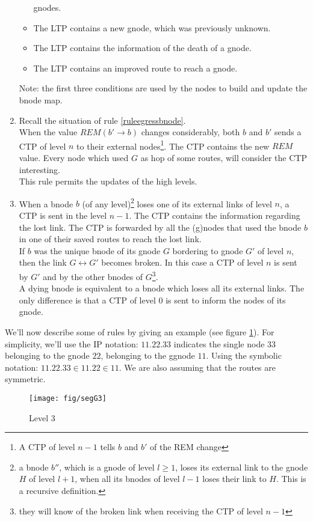 \documentclass[a4paper]{article}
\begin{document}
\begin{enumerate}
\begin{itemize}
				gnodes.
			\item The LTP contains a new gnode, which was
				previously unknown.
			\item The LTP contains the information of the death of a
				gnode.
			\item The LTP contains an improved route to reach a
				gnode.
		\end{itemize}
		Note: the first three conditions are used by the nodes to
		build and update the bnode map.
	\item Recall the situation of rule \ref{ruleegressbnode}.\\
		When the value $REM(b'\rightarrow b)$ changes
		considerably,
		both $b$ and $b'$ sends a CTP of level $n$ to their external
		nodes\footnote{A CTP of level $n-1$ tells $b$ and $b'$ of the
		REM change}. The CTP contains the new $REM$ value. Every node which used $G$ as hop of some routes,
		will consider the CTP interesting.\\
		This rule permits the updates of the high levels.
	\item When a bnode $b$ (of any level)\footnote{a bnode $b''$, which is a
		gnode of level $l\ge 1$, loses its external link to the gnode
		$H$ of level $l+1$, when all its
		bnodes of level $l-1$ loses their link to $H$. This is a
		recursive definition.}
		loses one of its external links of
		level $n$, a CTP is sent in the level $n-1$.  The CTP contains
		the information regarding the lost link.
		The CTP is forwarded by all the (g)nodes that used the
		bnode $b$ in one of their saved routes to reach the lost link.\\
		If $b$ was the unique bnode of its gnode $G$
		bordering to gnode $G'$ of level $n$, then the link
		$G\leftrightarrow G'$ becomes broken. In this case a CTP of
		level $n$ is sent by $G'$ and by the other bnodes of
		$G$\footnote{they will know of the broken link when receiving
		the CTP of level $n-1$}.\\
		A dying bnode is equivalent to a bnode which loses all its
		external links. The only difference is that a CTP of level 0
		is sent to inform the nodes of its gnode.
\end{enumerate}
We'll now describe some of rules by giving an example (see figure
\ref{figexq2}). For simplicity, we'll use the IP notation: $11.22.33$
indicates the single node $33$ belonging to the gnode $22$, belonging to the
ggnode $11$. Using the symbolic notation: $11.22.33 \in 11.22 \in 11$. We are
also assuming that the routes are symmetric.
\begin{figure}[h]
	\begin{center}
		\texttt{[image: fig/segG3]}
	\end{center}
	\caption{Level 3}
	\label{figexq2}
\end{figure}
\end{document}
